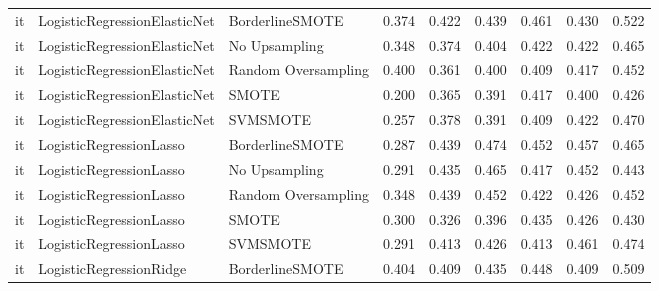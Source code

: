 \begin{tabular}{lllllllll}
      it & LogisticRegressionElasticNet &     BorderlineSMOTE &     0.374 &                     0.422 &                 0.439 &                  0.461 &                                   0.430 &     0.522 \\
      it & LogisticRegressionElasticNet &       No Upsampling &     0.348 &                     0.374 &                 0.404 &                  0.422 &                                   0.422 &     0.465 \\
      it & LogisticRegressionElasticNet & Random Oversampling &     0.400 &                     0.361 &                 0.400 &                  0.409 &                                   0.417 &     0.452 \\
      it & LogisticRegressionElasticNet &               SMOTE &     0.200 &                     0.365 &                 0.391 &                  0.417 &                                   0.400 &     0.426 \\
      it & LogisticRegressionElasticNet &            SVMSMOTE &     0.257 &                     0.378 &                 0.391 &                  0.409 &                                   0.422 &     0.470 \\
      it &      LogisticRegressionLasso &     BorderlineSMOTE &     0.287 &                     0.439 &                 0.474 &                  0.452 &                                   0.457 &     0.465 \\
      it &      LogisticRegressionLasso &       No Upsampling &     0.291 &                     0.435 &                 0.465 &                  0.417 &                                   0.452 &     0.443 \\
      it &      LogisticRegressionLasso & Random Oversampling &     0.348 &                     0.439 &                 0.452 &                  0.422 &                                   0.426 &     0.452 \\
      it &      LogisticRegressionLasso &               SMOTE &     0.300 &                     0.326 &                 0.396 &                  0.435 &                                   0.426 &     0.430 \\
      it &      LogisticRegressionLasso &            SVMSMOTE &     0.291 &                     0.413 &                 0.426 &                  0.413 &                                   0.461 &     0.474 \\
      it &      LogisticRegressionRidge &     BorderlineSMOTE &     0.404 &                     0.409 &                 0.435 &                  0.448 &                                   0.409 &     0.509 \\

\end{tabular}
